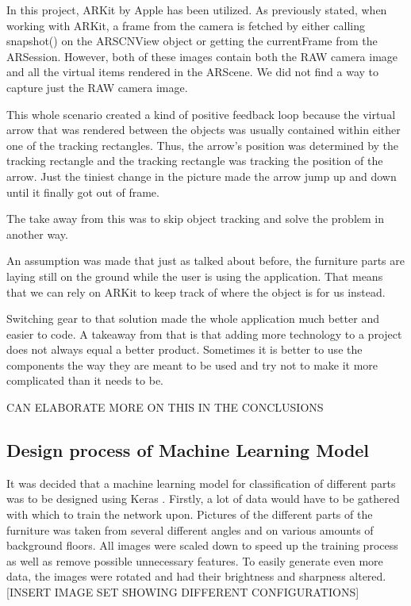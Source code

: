 In this project, ARKit by Apple has been utilized. As previously stated, when working with ARKit, a frame from the camera is fetched by either calling snapshot() on the ARSCNView object or getting the currentFrame from the ARSession.
However, both of these images contain both the RAW camera image and all the virtual items rendered in the ARScene. We did not find a way to capture just the RAW camera image.

This whole scenario created a kind of positive feedback loop because the virtual arrow that was rendered between the objects was usually contained within either one of the tracking rectangles. Thus, the arrow's position was determined by the tracking rectangle and the tracking rectangle was tracking the position of the arrow.
Just the tiniest change in the picture made the arrow jump up and down until it finally got out of frame.

The take away from this was to skip object tracking and solve the problem in another way.

An assumption was made that just as talked about before, the furniture parts are laying still on the ground while the user is using the application. That means that we can rely on ARKit to keep track of where the object is for us instead.

Switching gear to that solution made the whole application much better and easier to code. A takeaway from that is that adding more technology to a project does not always equal a better product. Sometimes it is better to use the components the way they are meant to be used and try not to make it more complicated than it needs to be.

CAN ELABORATE MORE ON THIS IN THE CONCLUSIONS


\subsection{Design process of Machine Learning Model}
It was decided that a machine learning model for classification of different parts was to be designed using Keras \cite{keras}. Firstly, a lot of data would have to be gathered with which to train the network upon. Pictures of the different parts of the furniture was taken from several different angles and on various amounts of background floors. 
All images were scaled down to speed up the training process as well as remove possible unnecessary features. To easily generate even more data, the images were rotated and had their brightness and sharpness altered. 
[INSERT IMAGE SET SHOWING DIFFERENT CONFIGURATIONS]
 
